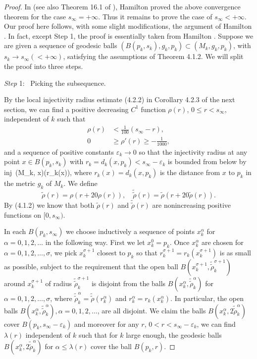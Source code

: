 \begin{proof}
In \cite{Ha95} (see also Theorem 16.1 of \cite{Ha95F}), Hamilton
proved the above convergence theorem for the case $s_{\infty} =
+\infty$. Thus it remains to prove the case of $s_{\infty} <
+\infty$. Our proof here follows, with some slight modifications,
the argument of Hamilton \cite{Ha95}. In fact, except Step 1, the
proof is essentially taken from Hamilton \cite{Ha95}. Suppose we
are given a sequence of geodesic balls $(B(p_k,s_k),g_k, p_k)
\subset (M_k,g_k,p_k)$, with $s_k \rightarrow s_{\infty} (<
+\infty)$, satisfying the assumptions of Theorem 4.1.2. We will
split the proof into three steps.

\medskip
{\it Step} 1: \ Picking the subsequence.

\smallskip
By the local injectivity radius estimate (4.2.2) in Corollary
4.2.3 of the next section, we can find a positive decreasing $C^1$
function $\rho (r)$, $0 \leq r < s_{\infty}$, independent of $k$
such that
\begin{align}
\rho(r) &< \frac{1}{100}(s_{\infty} - r), \\  %
0 &\geq \rho'(r) \geq -\frac{1}{1000}, %
\end{align}
and a sequence of positive constants $\varepsilon_k \rightarrow 0$
so that the injectivity radius at any point $x\in B(p_k,s_k)$ with
$r_k = d_k(x,p_k) < s_{\infty} - \varepsilon_k$ is bounded from
below by \be
{\rm inj}\, (M_k, x)\rho (r_k(x)),  %
\ee where $r_k(x)=d_k(x, p_k)$ is the distance from $x$ to $p_k$
in the metric $g_k$ of $M_k$. We define
$$
\tilde\rho(r)=\rho(r+20\rho(r)),\quad
\tilde{\tilde\rho}(r)=\tilde\rho(r+20\tilde\rho(r)).
$$
By (4.1.2) we know that both $\tilde{\rho}(r)$ and
$\tilde{\tilde{\rho}}(r)$ are nonincreasing positive functions on
$[0,s_{\infty})$.

In each $B(p_k,s_{\infty})$ we choose inductively a sequence of
points $x_k^{\alpha}$ for $\alpha=0,1,2,\ldots$ in the following
way. First we let $x_k^0=p_k$. Once $x_k^{\alpha}$ are chosen for
$\alpha=0,1,2,\ldots, \sigma$, we pick $x_k^{\sigma+1}$ closest to
$p_k$ so that $r_k^{\sigma+1}=r_k(x_k^{\sigma+1})$ is as small as
possible, subject to the requirement that the open ball
$B(x_k^{\sigma+1}, \tilde{\tilde\rho}_k^{\sigma+1})$ around
$x_k^{\sigma+1}$ of radius $\tilde{\tilde\rho}_k^{\sigma+1}$ is
disjoint from the balls $B(x_k^{\alpha},
\tilde{\tilde\rho}_k^{\alpha})$ for $\alpha=0,1,2,\ldots, \sigma$,
where
$\tilde{\tilde\rho}_k^{\alpha}=\tilde{\tilde\rho}(r_k^{\alpha})$
and $r_k^{\alpha}=r_k(x_k^{\alpha})$. In particular, the open
balls $B(x_k^{\alpha}, \tilde{\tilde\rho}_k^{\alpha}),
\alpha=0,1,2,\ldots$, are all disjoint. We claim the balls
$B(x_k^{\alpha}, 2\tilde{\tilde\rho}_k^{\alpha})$ cover
$B(p_k,s_{\infty}-\varepsilon_k)$ and moreover for any $ r$, $0< r
<s_{\infty} -\varepsilon_k$, we can find $\lambda ( r)$
independent of $k$ such that for $k$ large enough, the geodesic
balls $B(x_k^{\alpha}, 2\tilde{\tilde\rho}_k^{\alpha})$ for
$\alpha\le\lambda ( r)$ cover the ball $B(p_k,r)$.


\end{proof}
